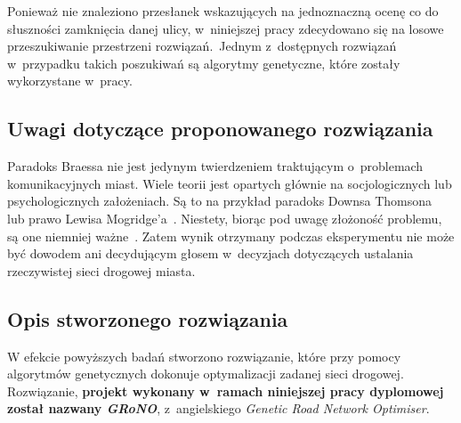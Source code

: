 \documentclass[twoside,12pt]{report}
\begin{document}
Ponieważ nie znaleziono przesłanek wskazujących na jednoznaczną ocenę co do słuszności zamknięcia danej ulicy, w~niniejszej pracy zdecydowano się na losowe przeszukiwanie przestrzeni rozwiązań.~Jednym z~dostępnych rozwiązań w~przypadku takich poszukiwań są algorytmy genetyczne, które zostały wykorzystane w~pracy.

\subsection{Uwagi dotyczące proponowanego rozwiązania}
Paradoks Braessa nie jest jedynym twierdzeniem traktującym o~problemach komunikacyjnych miast. Wiele teorii jest opartych głównie na socjologicznych lub psychologicznych założeniach. Są to na przykład paradoks Downsa Thomsona~\cite{urban} lub prawo Lewisa Mogridge’a~\cite{lewis}. Niestety, biorąc pod uwagę złożoność problemu, są one niemniej ważne~\cite{investigation}. Zatem wynik otrzymany podczas eksperymentu nie może być dowodem ani decydującym głosem w~decyzjach dotyczących ustalania rzeczywistej sieci drogowej miasta. 

\subsection{Opis stworzonego rozwiązania}
W efekcie powyższych badań stworzono rozwiązanie, które przy pomocy algorytmów genetycznych dokonuje optymalizacji zadanej sieci drogowej. Rozwiązanie, \textbf{projekt wykonany w~ramach niniejszej pracy dyplomowej został nazwany \textit{GRoNO}}, z~angielskiego \textit{Genetic Road Network Optimiser}. 

\end{document}
